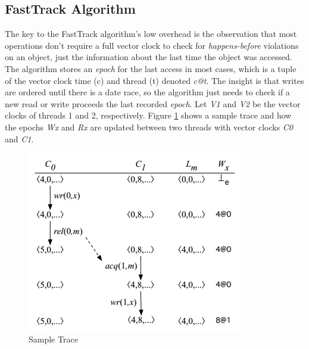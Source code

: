 \documentclass{acm_proc_article-sp}
\begin{document}
\subsection{FastTrack Algorithm}
The key to the FastTrack algorithm's low overhead is the observation that most operations don't require a full vector clock to check for \emph{happens-before} violations on an object, just the information about the last time the object was accessed. The algorithm stores an \emph{epoch} for the last access in most cases, which is a tuple of the vector clock time (c)  and thread (t) denoted \emph{c@t}. The insight is that writes are ordered until there is a date race, so the algorithm just needs to check if a new read or write proceeds the last recorded \emph{epoch}. Let\emph{ V1} and \emph{V2} be the vector clocks of threads 1 and 2, respectively.
Figure \ref{trace} shows a sample trace and how the epochs \emph{Wx} and \emph{Rx} are updated between two threads with vector clocks \emph{C0} and \emph{C1}.
 \begin{figure}[h]
    \centering
      \includegraphics[scale=.55]{full_trace_new}
      \caption{Sample Trace\label{trace}}
  \end{figure} 
\end{document}

